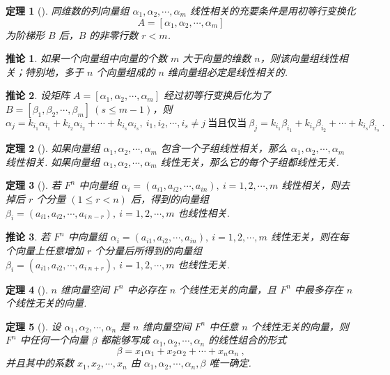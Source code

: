 \documentclass[zihao=-4,UTF8,linespread=1.8,nothm]{aytony_base}
\newtheorem{theorem}{\indent 定理}[subsection]
\newtheorem*{corollary}{\indent 推论}
\begin{document}
\begin{theorem}[]
    同维数的列向量组 $\alpha_1, \alpha_2, \cdots, \alpha_m$ 线性相关的充要条件是用初等行变换化 $$
        A = [\alpha_1, \alpha_2, \cdots, \alpha_m]
    $$ 为阶梯形 $B$ 后，$B$ 的非零行数 $r < m$.
\end{theorem}

\begin{corollary}
    如果一个向量组中向量的个数 $m$ 大于向量的维数 $n$，则该向量组线性相关；特别地，多于 $n$ 个向量组成的 $n$ 维向量组必定是线性相关的.
\end{corollary}

\begin{corollary}
    设矩阵 $A = [\alpha_1, \alpha_2, \cdots, \alpha_m]$ 经过初等行变换后化为了 $B = [\beta_1, \beta_2, \cdots, \beta_m]\ (s \leqslant m - 1)$，则 $$
        \alpha_j = k_{i_1}\alpha_{i_1}  + k_{i_2}\alpha_{i_2} + \cdots + k_{i_s}\alpha_{i_s}, \ i_1, i_2, \cdots, i_s \neq j\ \text{当且仅当}\ \beta_j = k_{i_1}\beta_{i_1} + k_{i_2}\beta_{i_2} + \cdots + k_{i_s}\beta_{i_s}\ .
    $$
\end{corollary}

\begin{theorem}[]
    如果向量组 $\alpha_1, \alpha_2, \cdots, \alpha_m$ 包含一个子组线性相关，那么 $\alpha_1, \alpha_2, \cdots, \alpha_m$ 线性相关. 如果向量组 $\alpha_1, \alpha_2, \cdots, \alpha_m$ 线性无关，那么它的每个子组都线性无关.
\end{theorem}

\begin{theorem}[]
    若 $F^n$ 中向量组 $\alpha_i = (a_{i1}, a_{i2}, \cdots, a_{in}),\ i = 1, 2, \cdots, m$ 线性相关，则去掉后 $r$ 个分量 $(1 \leqslant r < n)$ 后，得到的向量组 $\beta_i = (a_{i1}, a_{i2}, \cdots, a_{i\ n-r}),\ i = 1, 2, \cdots, m$ 也线性相关.
\end{theorem}

\begin{corollary}
    若 $F^n$ 中向量组 $\alpha_i = (a_{i1}, a_{i2}, \cdots, a_{in}),\ i = 1, 2, \cdots, m$ 线性无关，则在每个向量上任意增加 $r$ 个分量后所得到的向量组 $\beta_i = (a_{i1}, a_{i2}, \cdots, a_{i\ n+r}),\ i = 1, 2, \cdots, m$ 也线性无关.
\end{corollary}

\begin{theorem}[]
    $n$ 维向量空间 $F^n$ 中必存在 $n$ 个线性无关的向量，且 $F^n$ 中最多存在 $n$ 个线性无关的向量.
\end{theorem}

\begin{theorem}[]
    设 $\alpha_1, \alpha_2, \cdots, \alpha_n$ 是 $n$ 维向量空间 $F^n$ 中任意 $n$ 个线性无关的向量，则 $F^n$ 中任何一个向量 $\beta$ 都能够写成 $\alpha_1, \alpha_2, \cdots, \alpha_n$ 的线性组合的形式 $$
        \beta = x_1\alpha_1 + x_2\alpha_2 + \cdots + x_n\alpha_n\ ,
    $$ 并且其中的系数 $x_1, x_2, \cdots, x_n$ 由 $\alpha_1, \alpha_2, \cdots, \alpha_n, \beta$ 唯一确定.
\end{theorem}
\end{document}
